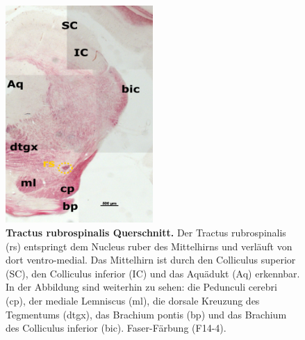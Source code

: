 \begin{figure}[H]
    \centering
    \includegraphics[width=0.5\textwidth]{pictures/Bilder_Laura/rubrospinal_tract_F14_4P_025x.png}
    \caption[Tractus rubrospinalis Querschnitt]{\textbf{Tractus rubrospinalis Querschnitt.} Der Tractus rubrospinalis (rs) entspringt dem Nucleus ruber des Mittelhirns und verläuft von dort ventro-medial. Das Mittelhirn ist durch den Colliculus superior (SC), den Colliculus inferior (IC) und das Aquädukt (Aq) erkennbar. In der Abbildung sind weiterhin zu sehen: die Pedunculi cerebri (cp), der mediale Lemniscus (ml), die dorsale Kreuzung des Tegmentums (dtgx), das Brachium pontis (bp) und das Brachium des Colliculus inferior (bic). Faser-Färbung (F14-4).}
    \label{fig:rubrospinal_tract}
\end{figure}


